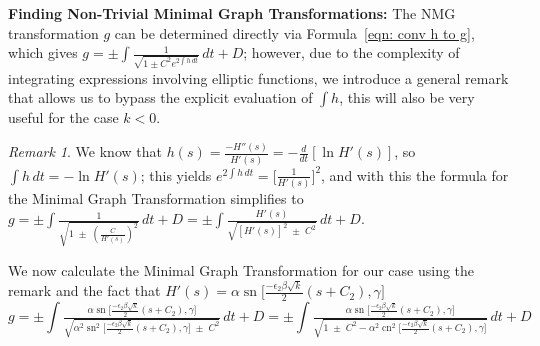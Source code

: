 \documentclass[12pt]{article}
\theoremstyle{plain}
\theoremstyle{definition}
\theoremstyle{remark}
\newtheorem{remark}[theorem]{Remark}
\begin{document}
  \textbf{Finding Non-Trivial Minimal Graph Transformations: } The NMG transformation \(g\) can be determined directly via Formula~\ref{eqn: conv h to g}, which gives \(g = \pm \int \frac{1}{\sqrt{1 \pm C^2 e^{2\int h\, dt}}}\, dt + D\); however, due to the complexity of integrating expressions involving elliptic functions, we introduce a general remark that allows us to bypass the explicit evaluation of \(\int h\), this will also be very useful for the case \(k<0\).
  \begin{remark}\label{remark: bypassing int h}
  	We know that \(h(s)=\frac{-H''(s)}{H'(s)}=-\frac{d}{dt}[\ln H'(s)]\), so \(\int h\,dt=-\ln H'(s)\); this yields \(e^{2\int h\,dt}=\big[\frac{1}{H'(s)}\big]^2\), and with this the formula for the Minimal Graph Transformation simplifies to \footnotesize\(g =  \pm \displaystyle \int \tfrac{1}{\sqrt{1\; \pm\; \left(\frac{C}{H'(s)}\right)^2}}\, dt + D=\pm \displaystyle \int \tfrac{H'(s)}{\sqrt{[H'(s)]^2\; \pm\; C^2}}\, dt + D\)\normalsize.
  \end{remark}
  We now calculate the Minimal Graph Transformation for our case using the remark and the fact that \(H'(s)=\alpha\operatorname{sn}\big[\tfrac{-\epsilon_2\beta\sqrt k}{2}(s+C_2),\gamma\big]\)
  \footnotesize\[
    g=\pm \int \tfrac{\alpha\operatorname{sn}\big[\tfrac{-\epsilon_2\beta\sqrt k}{2}(s+C_2),\gamma\big]}{\sqrt{\alpha^2\operatorname{sn}^2\big[\tfrac{-\epsilon_2\beta\sqrt k}{2}(s+C_2),\gamma\big]\; \pm\; C^2}}\, dt + D=\pm \int \tfrac{\alpha\operatorname{sn}\big[\tfrac{-\epsilon_2\beta\sqrt k}{2}(s+C_2),\gamma\big]}{\sqrt{1\; \pm\; C^2-\alpha^2\operatorname{cn}^2\big[\tfrac{-\epsilon_2\beta\sqrt k}{2}(s+C_2),\gamma\big]}}\, dt + D
  \]\normalsize
\end{document}
